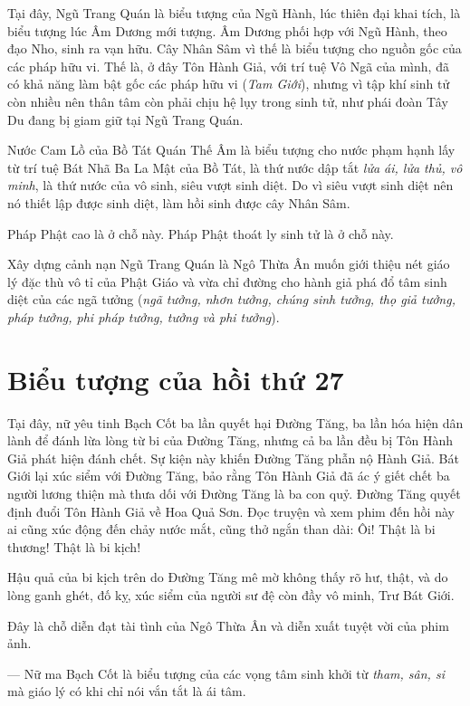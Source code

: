 Tại đây, Ngũ Trang Quán là biểu tượng của Ngũ Hành, lúc thiên đại khai tích, là biểu tượng lúc Âm Dương mới tượng. Âm Dương phối hợp với Ngũ Hành, theo đạo Nho, sinh ra vạn hữu. Cây Nhân Sâm vì thế là biểu tượng cho nguồn gốc của các pháp hữu vi. Thế là, ở đây Tôn Hành Giả, với trí tuệ Vô Ngã của mình, đã có khả năng làm bật gốc các pháp hữu vi (\emph{Tam Giới}), nhưng vì tập khí sinh tử còn nhiều nên thân tâm còn phải chịu hệ lụy trong sinh tử, như phái đoàn Tây Du đang bị giam giữ tại Ngũ Trang Quán.

Nước Cam Lồ của Bồ Tát Quán Thế Âm là biểu tượng cho nước phạm hạnh lấy từ trí tuệ Bát Nhã Ba La Mật của Bồ Tát, là thứ nước dập tắt \emph{lửa ái, lửa thủ, vô minh}, là thứ nước của vô sinh, siêu vượt sinh diệt. Do vì siêu vượt sinh diệt nên nó thiết lập được sinh diệt, làm hồi sinh được cây Nhân Sâm.

Pháp Phật cao là ở chỗ này. Pháp Phật thoát ly sinh tử là ở chỗ này.

Xây dựng cảnh nạn Ngũ Trang Quán là Ngô Thừa Ân muốn giới thiệu nét giáo lý đặc thù vô tỉ của Phật Giáo và vừa chỉ đường cho hành giả phá đổ tâm sinh diệt của các ngã tưởng (\emph{ngã tưởng, nhơn tưởng, chúng sinh tưởng, thọ giả tưởng, pháp tưởng, phi pháp tưởng, tưởng và phi tưởng}).

\section{Biểu tượng của hồi thứ 27} %
\label{sec:bieu_tuong_cua_hoi_thu_27}

Tại đây, nữ yêu tinh Bạch Cốt ba lần quyết hại Đường Tăng, ba lần hóa hiện dân lành để đánh lừa lòng từ bi của Đường Tăng, nhưng cả ba lần đều bị Tôn Hành Giả phát hiện đánh chết. Sự kiện này khiến Đường Tăng phẫn nộ Hành Giả. Bát Giới lại xúc siểm với Đường Tăng, bảo rằng Tôn Hành Giả đã ác ý giết chết ba người lương thiện mà thưa dối với Đường Tăng là ba con quỷ. Đường Tăng quyết định đuổi Tôn Hành Giả về Hoa Quả Sơn. Đọc truyện và xem phim đến hồi này ai cũng xúc động đến chảy nước mắt, cũng thở ngắn than dài: Ôi! Thật là bi thương! Thật là bi kịch!

Hậu quả của bi kịch trên do Đường Tăng mê mờ không thấy rõ hư, thật, và do lòng ganh ghét, đố kỵ, xúc siểm của người sư đệ còn đầy vô minh, Trư Bát Giới.

Đây là chỗ diễn đạt tài tình của Ngô Thừa Ân và diễn xuất tuyệt vời của phim ảnh.

— Nữ ma Bạch Cốt là biểu tượng của các vọng tâm sinh khởi từ \emph{tham, sân, si} mà giáo lý có khi chỉ nói vắn tắt là ái tâm.


